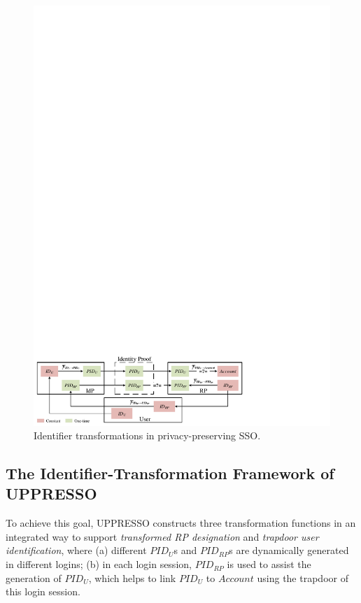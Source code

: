 \begin{figure}
  \centering
  \includegraphics[width=\linewidth]{fig/IDCorrelation.pdf}
  \caption{Identifier transformations in privacy-preserving SSO.}
  \label{fig:IDCorrelation}
  \vspace{-5mm}
\end{figure}


\subsection{The Identifier-Transformation Framework of UPPRESSO}
\label{subsec:solutions}

To achieve this goal, UPPRESSO constructs three transformation functions in an integrated way to support {\em transformed RP designation} and {\em trapdoor user identification}, where (a) different $PID_U$s and $PID_{RP}$s are dynamically generated in different logins; (b) in each login session, $PID_{RP}$ is used to assist the generation of $PID_U$, which helps to link $PID_U$ to $Account$ using the trapdoor of this login session.%



